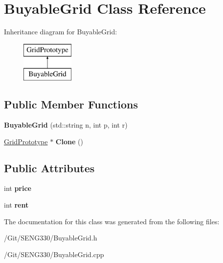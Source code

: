 \hypertarget{class_buyable_grid}{}\section{Buyable\+Grid Class Reference}
\label{class_buyable_grid}
Inheritance diagram for Buyable\+Grid\+:\begin{figure}[H]
\begin{center}
\leavevmode
\includegraphics[height=2.000000cm]{class_buyable_grid}
\end{center}
\end{figure}
\subsection*{Public Member Functions}
\begin{DoxyCompactItemize}
\item 
\hypertarget{class_buyable_grid_a585d1578a22848669e7098ef69a1eb7a}{}{\bfseries Buyable\+Grid} (std\+::string n, int p, int r)\label{class_buyable_grid_a585d1578a22848669e7098ef69a1eb7a}

\item 
\hypertarget{class_buyable_grid_ab89a24277dadeaa481aac4fee440481d}{}\hyperlink{class_grid_prototype}{Grid\+Prototype} $\ast$ {\bfseries Clone} ()\label{class_buyable_grid_ab89a24277dadeaa481aac4fee440481d}

\end{DoxyCompactItemize}
\subsection*{Public Attributes}
\begin{DoxyCompactItemize}
\item 
\hypertarget{class_buyable_grid_aebf9446316ca88220f3ddca0132ed102}{}int {\bfseries price}\label{class_buyable_grid_aebf9446316ca88220f3ddca0132ed102}

\item 
\hypertarget{class_buyable_grid_a3947c4d63ae3792745b7f49b6c336c0b}{}int {\bfseries rent}\label{class_buyable_grid_a3947c4d63ae3792745b7f49b6c336c0b}

\end{DoxyCompactItemize}


The documentation for this class was generated from the following files\+:\begin{DoxyCompactItemize}
\item 
/\+Git/\+S\+E\+N\+G330/Buyable\+Grid.\+h\item 
/\+Git/\+S\+E\+N\+G330/Buyable\+Grid.\+cpp\end{DoxyCompactItemize}
